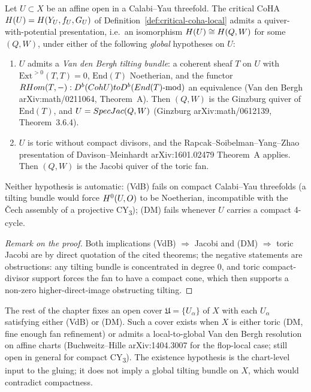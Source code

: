 \begin{proposition}
\label{prop:chart-quiver-presentation}
\ClaimStatusProposition
Let $U \subset X$ be an affine open in a Calabi--Yau threefold.
The critical CoHA $H(U) = H(Y_U, f_U, G_U)$ of
Definition~\ref{def:critical-coha-local} admits a
quiver-with-potential presentation, i.e.\ an isomorphism $H(U)
\cong H(Q, W)$ for some $(Q, W)$, under either of the following
\emph{global} hypotheses on $U$:
\begin{enumerate}
\item[(VdB)] $U$ admits a \emph{Van den Bergh tilting bundle}: a
  coherent sheaf $T$ on $U$ with $\mathrm{Ext}^{>0}(T, T) = 0$,
  $\mathrm{End}(T)$ Noetherian, and the functor
  $RHom(T, -): D^{b}(Coh U) to D^{b}(End(T)\text{-mod})$ an
  equivalence (Van den Bergh arXiv:math/0211064, Theorem~A). Then
  $(Q, W)$ is the Ginzburg quiver of $\mathrm{End}(T)$, and
  $U = Spec Jac(Q, W)$ (Ginzburg arXiv:math/0612139,
  Theorem~3.6.4).
\item[(DM)] $U$ is toric without compact divisors, and the
  Rapcak--Soibelman--Yang--Zhao presentation of
  Davison--Meinhardt arXiv:1601.02479 Theorem~A applies. Then
  $(Q, W)$ is the Jacobi quiver of the toric fan.
\end{enumerate}
Neither hypothesis is automatic: (VdB) fails on compact
Calabi--Yau threefolds (a tilting bundle would force $H^0(U, O)$
to be Noetherian, incompatible with the Čech assembly of a
projective CY\textsubscript{3}); (DM) fails whenever $U$ carries
a compact 4-cycle.
\end{proposition}

\begin{proof}[Remark on the proof]
Both implications (VdB) $\Rightarrow$ Jacobi and (DM) $\Rightarrow$
toric Jacobi are by direct quotation of the cited theorems; the
negative statements are obstructions: any tilting bundle is
concentrated in degree 0, and toric compact-divisor support forces
the fan to have a compact cone, which then supports a non-zero
higher-direct-image obstructing tilting.
\end{proof}

\begin{remark}
\label{rem:scope-critical-coha-local}
The rest of the chapter fixes an open cover $\mathfrak{U} =
\{U_\alpha\}$ of $X$ with each $U_\alpha$ satisfying either (VdB)
or (DM). Such a cover exists when $X$ is either toric (DM, fine
enough fan refinement) or admits a local-to-global Van den Bergh
resolution on affine charts (Buchweitz--Hille arXiv:1404.3007 for
the flop-local case; still open in general for compact CY\textsubscript{3}).
The existence hypothesis is the chart-level input to the
gluing; it does not imply a global tilting bundle on $X$, which
would contradict compactness.
\end{remark}

